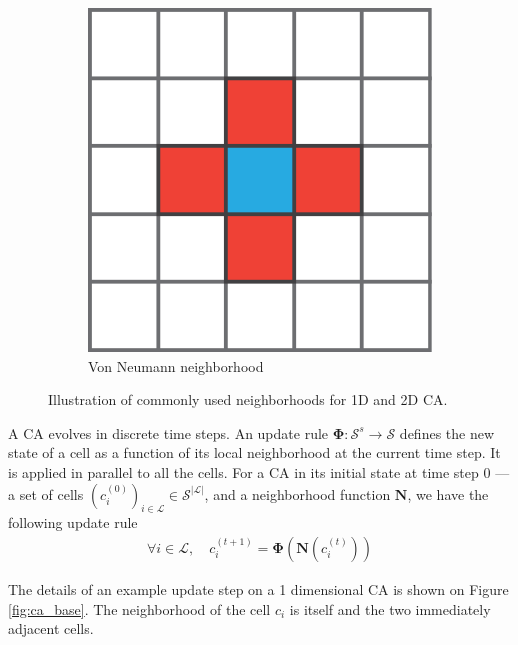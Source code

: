 \begin{figure}[htbp]
\begin{subfigure}[c]{.3\linewidth}
    \includegraphics[width=\linewidth]{figures/von_neumann}
    \caption{Von Neumann neighborhood}
    \label{fig:von_neumann}
  \end{subfigure}

  \caption{Illustration of commonly used neighborhoods for 1D and 2D \ac{CA}.}
  \label{fig:neighborhoods}
\end{figure}

A \ac{CA} evolves in discrete time steps. An update rule
$\boldsymbol{\Phi}: \mathcal{S}^{s} \rightarrow \mathcal{S}$ defines the new state of a cell as a
function of its local neighborhood at the current time step. It is applied in
parallel to all the cells. For a \ac{CA} in its initial state at time
step 0 --- \ie a set of cells $\left(c_{i}^{(0)}\right)_{i \in \mathcal{L}} \in \mathcal{S}^{|\mathcal{L}|}$, and a
neighborhood function $\boldsymbol{N}$, we have the following update rule
\begin{equation}
\begin{aligned}
\forall i \in \mathcal{L}, \quad c_{i}^{(t + 1)} = \boldsymbol{\Phi}\left(\boldsymbol{N}\left(c_{i}^{(t)}\right)\right)
\end{aligned}
\end{equation}

The details of an example update step on a 1 dimensional \ac{CA} is shown on
Figure \ref{fig:ca_base}. The neighborhood of the cell $c_{i}$ is itself and the
two immediately adjacent cells.

